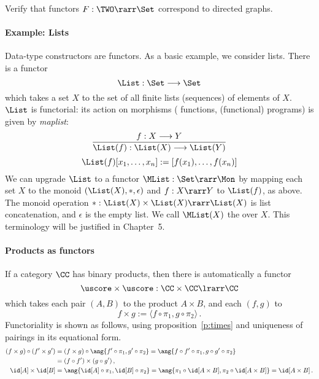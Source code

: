 \documentclass[12pt]{article}
\begin{document}
\begin{myexercise}
Verify that functors $F:\TWO\rarr\Set$ correspond to {directed graphs}.
\end{myexercise}

\paragraph{Example: Lists}

Data-type constructors are functors. As a basic example, we consider
lists. There is a functor
\[ \List : \Set \longrightarrow \Set \]
which takes a set $X$ to the set of all finite lists (sequences) of
elements of $X$. $\List$ is functorial: its action on morphisms (\ie
functions, \ie (functional) programs) is given by \emph{maplist}:
\[ \frac{f : X \longrightarrow Y}{\List (f) : \List (X)
  \longrightarrow \List (Y)} \]
\[ \List (f) [ x_1 , \ldots , x_n ] := [ f(x_1 ), \ldots , f(x_n )] \]
We can upgrade $\List$ to a functor $\MList:\Set\rarr\Mon$ by mapping each set $X$ to the monoid $(\List(X),*,\epsilon)$ and $f:X\rarr Y$ to
$\List(f)$, as above. The monoid operation $*:\List(X)\times\List(X)\rarr\List(X)$ is list concatenation, and $\epsilon$ is the empty list. We call
$\MList(X)$ the  over $X$. This terminology will be justified in Chapter~5.

\paragraph{Products as functors} If a category $\CC$ has binary products, then there is automatically a functor
\[ \uscore\times\uscore : \CC \times \CC \lrarr \CC \]
which takes each pair $(A,B)$ to the product $A\times B$, and each $(f, g)$ to
\[ f \times g := \langle f \circ \pi_1 , g \circ \pi_2 \rangle\,. \]
Functoriality is shown as follows, using proposition~\ref{p:times} and uniqueness of pairings in its equational form.
\begin{align*}
  (f\times g)\circ(f'\times g') &= (f\times g)\circ\ang{f'\circ\pi_1,g'\circ\pi_2}=\ang{f\circ f'\circ\pi_1,g\circ g'\circ\pi_2} \\
    &= (f\circ f')\times(g\circ g')\,,\\
  \id[A]\times\id[B] &= \ang{\id[A]\circ\pi_1,\id[B]\circ\pi_2} = \ang{\pi_1\circ\id[A\times B],\pi_2\circ\id[A\times B]} = \id[A\times B]\,.
\end{align*}
\end{document}
